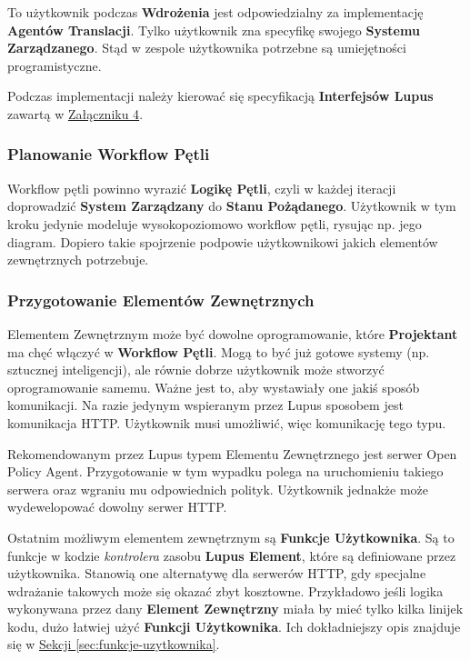 To użytkownik podczas \textbf{Wdrożenia} jest odpowiedzialny za implementację \textbf{Agentów Translacji}. Tylko użytkownik zna specyfikę swojego \textbf{Systemu Zarządzanego}. Stąd w zespole użytkownika potrzebne są umiejętności programistyczne. 

Podczas implementacji należy kierować się specyfikacją \textbf{Interfejsów Lupus} zawartą w \hyperref[appendix:4]{Załączniku 4}.

\subsubsection{Planowanie Workflow Pętli}

Workflow pętli powinno wyrazić \textbf{Logikę Pętli}, czyli w każdej iteracji doprowadzić \textbf{System Zarządzany} do \textbf{Stanu Pożądanego}. Użytkownik w tym kroku jedynie modeluje wysokopoziomowo workflow pętli, rysując np. jego diagram. Dopiero takie spojrzenie podpowie użytkownikowi jakich elementów zewnętrznych potrzebuje.

\subsubsection{Przygotowanie Elementów Zewnętrznych}

Elementem Zewnętrznym może być dowolne oprogramowanie, które \textbf{Projektant} ma chęć włączyć w \textbf{Workflow Pętli}. Mogą to być już gotowe systemy (np. sztucznej inteligencji), ale równie dobrze użytkownik może stworzyć oprogramowanie samemu. Ważne jest to, aby wystawiały one jakiś sposób komunikacji. Na razie jedynym wspieranym przez Lupus sposobem jest komunikacja HTTP. Użytkownik musi umożliwić, więc komunikację tego typu.

Rekomendowanym przez Lupus typem Elementu Zewnętrznego jest serwer Open Policy Agent. Przygotowanie w tym wypadku polega na uruchomieniu takiego serwera oraz wgraniu mu odpowiednich polityk. Użytkownik jednakże może wydewelopować dowolny serwer HTTP.

Ostatnim możliwym elementem zewnętrznym są \textbf{Funkcje Użytkownika}. Są to funkcje w kodzie \textit{kontrolera} zasobu \textbf{Lupus Element}, które są definiowane przez użytkownika. Stanowią one alternatywę dla serwerów HTTP, gdy specjalne wdrażanie takowych może się okazać zbyt kosztowne. Przykładowo jeśli logika wykonywana przez dany \textbf{Element Zewnętrzny} miała by mieć tylko kilka linijek kodu, dużo łatwiej użyć \textbf{Funkcji Użytkownika}. Ich dokładniejszy opis znajduje się w \hyperref[sec:funkcje-uzytkownika]{Sekcji \ref{sec:funkcje-uzytkownika}}.

